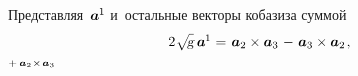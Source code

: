 \begin{otherlanguage}{russian}
\begin{comment} %
\[\scalebox{0.92}[0.92]{$\begin{array}{l@{\hspace{0.3em}}c@{\hspace{0.36em}}r}
\gamma \hspace{0.1ex} \bm{a}^{\hspace{-0.1ex}1} & = & \hspace{0.1ex} \bm{a}_2 \hspace{-0.1ex} \times \bm{a}_3 \hspace{0.1ex} \\[0.2em]
\gamma \hspace{0.1ex} \bm{a}^2 & = & \hspace{0.1ex} \bm{a}_3 \hspace{-0.1ex} \times \bm{a}_1 \hspace{0.1ex} \\[0.2em]
\gamma \hspace{0.1ex} \bm{a}^3 & = & \hspace{0.1ex} \bm{a}_1 \hspace{-0.16ex} \times \bm{a}_2 \hspace{0.1ex}
\end{array}$}\]
\end{comment} %

Представляя~${\bm{a}^{\hspace{-0.1ex}1}\hspace{-0.1ex}}$ и~остальные векторы кобазиза суммой
\vspace{1.1em}\[\begin{array}{l@{\hspace{0.3em}}c@{\hspace{0.36em}}r}
2 \hspace{0.1ex} \scalebox{0.95}[0.96]{$\sqrt{\hspace{-0.36ex}\mathstrut{\textsl{g}}}$} \hspace{0.5ex} \bm{a}^{\hspace{-0.1ex}1} & = & \bm{a}_2 \times \bm{a}_3 \hspace{0.2ex} \tikzmark{BeginPlusToMinus} - \hspace{0.2ex} \bm{a}_3 \times \bm{a}_2 \tikzmark{EndPlusToMinus} \hspace{0.2ex},
\end{array}\]%
%
{${\scriptstyle {+ \hspace{0.4ex} \bm{a}_2 \hspace{0.1ex} \times \hspace{0.2ex} \bm{a}_3}}$}


\end{otherlanguage}

